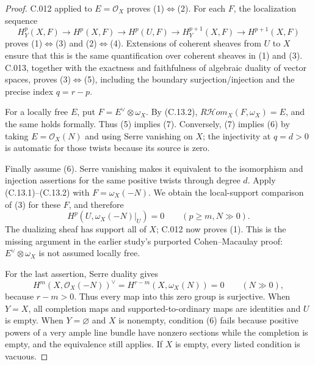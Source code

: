 \begin{proof}
C.012 applied to $E=\mathcal O_X$ proves (1)$\Leftrightarrow$(2).
For each $F$, the localization sequence
\[
 H_Y^p(X,F)\longrightarrow H^p(X,F)\longrightarrow H^p(U,F)
 \longrightarrow H_Y^{p+1}(X,F)\longrightarrow H^{p+1}(X,F)
\]
proves (1)$\Leftrightarrow$(3) and (2)$\Leftrightarrow$(4).
Extensions of coherent sheaves from $U$ to $X$ ensure that this is the same
quantification over coherent sheaves in (1) and (3).
C.013, together with the exactness and faithfulness of algebraic duality
of vector spaces, proves (3)$\Leftrightarrow$(5), including the boundary
surjection/injection and the precise index $q=r-p$.

For a locally free $E$, put $F=E^\vee\otimes\omega_X$.
By (C.13.2),
$R\mathcal Hom_X(F,\omega_X)=E$, and the same holds formally.
Thus (5) implies (7). Conversely, (7) implies (6) by taking $E=\mathcal O_X(N)$
and using Serre vanishing on $X$; the injectivity at $q=d>0$ is automatic
for those twists because its source is zero.

Finally assume (6). Serre vanishing makes it equivalent to the isomorphism
and injection assertions for the same positive twists through degree $d$.
Apply (C.13.1)--(C.13.2) with $F=\omega_X(-N)$.
We obtain the local-support comparison of (3) for these $F$, and therefore
\[
 H^p(U,\omega_X(-N)|_U)=0\qquad(p\geq m, N\gg0).
\]
The dualizing sheaf has support all of $X$; C.012 now proves (1).
This is the missing argument in the earlier study's purported
Cohen--Macaulay proof: $E^\vee\otimes\omega_X$ is not assumed locally free.

For the last assertion, Serre duality gives
\[
 H^m(X,\mathcal O_X(-N))^\vee
 =H^{r-m}(X,\omega_X(N))=0\qquad(N\gg0),
\]
because $r-m>0$. Thus every map into this zero group is surjective.
When $Y=X$, all completion maps and supported-to-ordinary maps are
identities and $U$ is empty. When $Y=\varnothing$ and $X$ is nonempty,
condition (6) fails because positive powers of a very ample line bundle
have nonzero sections while the completion is empty, and the equivalence
still applies. If $X$ is empty, every listed condition is vacuous.
\end{proof}

